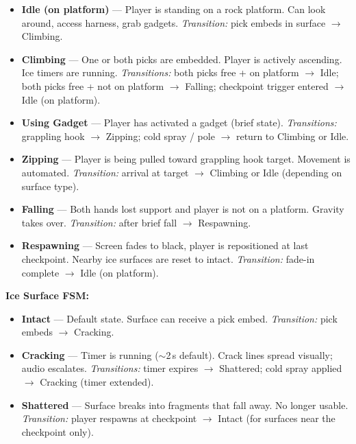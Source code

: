 \documentclass[12pt]{article}
\begin{document}
\begin{itemize}[leftmargin=2em]
    \item \textbf{Idle (on platform)} --- Player is standing on a rock platform. Can look around, access harness, grab gadgets. \emph{Transition:} pick embeds in surface $\rightarrow$ Climbing.
    \item \textbf{Climbing} --- One or both picks are embedded. Player is actively ascending. Ice timers are running. \emph{Transitions:} both picks free + on platform $\rightarrow$ Idle; both picks free + not on platform $\rightarrow$ Falling; checkpoint trigger entered $\rightarrow$ Idle (on platform).
    \item \textbf{Using Gadget} --- Player has activated a gadget (brief state). \emph{Transitions:} grappling hook $\rightarrow$ Zipping; cold spray / pole $\rightarrow$ return to Climbing or Idle.
    \item \textbf{Zipping} --- Player is being pulled toward grappling hook target. Movement is automated. \emph{Transition:} arrival at target $\rightarrow$ Climbing or Idle (depending on surface type).
    \item \textbf{Falling} --- Both hands lost support and player is not on a platform. Gravity takes over. \emph{Transition:} after brief fall $\rightarrow$ Respawning.
    \item \textbf{Respawning} --- Screen fades to black, player is repositioned at last checkpoint. Nearby ice surfaces are reset to intact. \emph{Transition:} fade-in complete $\rightarrow$ Idle (on platform).
\end{itemize}

\textbf{Ice Surface FSM:}

\begin{itemize}[leftmargin=2em]
    \item \textbf{Intact} --- Default state. Surface can receive a pick embed. \emph{Transition:} pick embeds $\rightarrow$ Cracking.
    \item \textbf{Cracking} --- Timer is running ($\sim$2\,s default). Crack lines spread visually; audio escalates. \emph{Transitions:} timer expires $\rightarrow$ Shattered; cold spray applied $\rightarrow$ Cracking (timer extended).
    \item \textbf{Shattered} --- Surface breaks into fragments that fall away. No longer usable. \emph{Transition:} player respawns at checkpoint $\rightarrow$ Intact (for surfaces near the checkpoint only).
\end{itemize}
\end{document}
